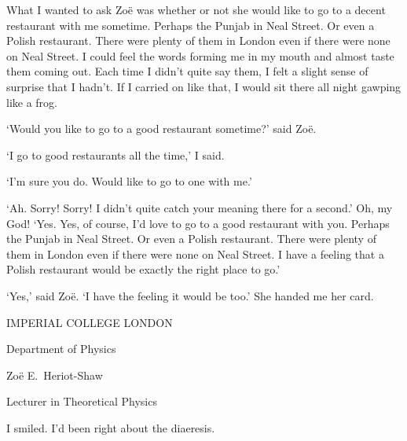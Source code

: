 What I wanted to ask Zoë was whether or not she would like to go
to a decent restaurant with me sometime. Perhaps the Punjab in Neal Street. Or even a Polish restaurant. There were plenty of them in London even if there were none on Neal Street. I could feel the words forming me in my mouth and
almost taste them coming out. Each time I didn't quite say them, I
felt a slight sense of surprise that I hadn't. If I
carried on like that, I would sit there all night gawping like a
frog.

`Would you like to go to a good restaurant sometime?' said Zoë.

`I go to good restaurants all the time,' I said.

`I'm sure you do. Would like to go to one with {\twelveit me}.'

`Ah. Sorry! Sorry! I didn't quite catch your
meaning there for a second.' Oh, my God! `Yes. Yes, of course, I'd
love to go to a good restaurant with you. Perhaps the Punjab in Neal Street. Or even a Polish restaurant. There were plenty of them in London even if there were none on Neal Street. I have a feeling that a Polish restaurant would be exactly the right place to go.'

`Yes,' said Zoë. `I have the feeling it would be too.' She handed me her card.

\vskip 1cm

{\twelvess \centerline{IMPERIAL COLLEGE LONDON}

\centerline{Department of Physics}

\centerline{Zoë E.~Heriot-Shaw}

\centerline{Lecturer in Theoretical Physics}}

\vskip 1cm

I smiled. I'd been right about the diaeresis.
\vfill\eject
